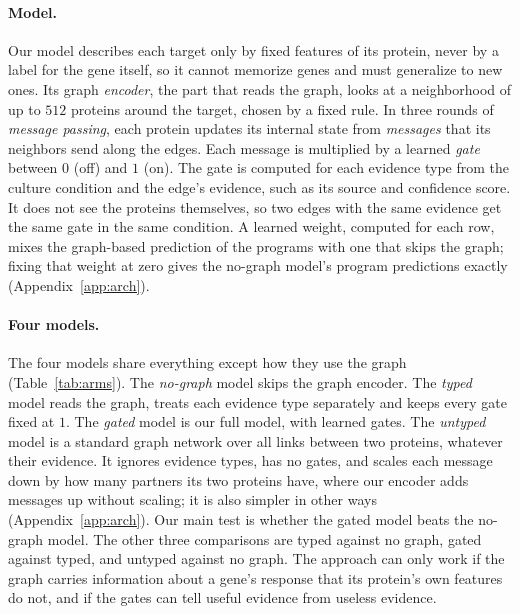 \documentclass{article}
\begin{document}
\paragraph{Model.} Our model describes each target only by fixed features of its protein, never by a label
for the gene itself, so it cannot memorize genes and must generalize to new ones. Its graph
\emph{encoder}, the part that reads the graph, looks at a neighborhood of up to $512$ proteins around the
target, chosen by a fixed rule. In three rounds of \emph{message passing}, each protein updates its
internal state from \emph{messages} that its neighbors send along the edges. Each message is multiplied by
a learned \emph{gate} between $0$ (off) and $1$ (on). The gate is computed for each evidence type from the
culture condition and the edge's evidence, such as its source and confidence score. It does not see the
proteins themselves, so two edges with the same evidence get the same gate in the same condition. A learned weight,
computed for each row, mixes the graph-based prediction of the programs with one that skips the graph;
fixing that weight at zero gives the no-graph model's program predictions exactly
(Appendix~\ref{app:arch}).

\paragraph{Four models.} The four models share everything except how they use the graph
(Table~\ref{tab:arms}). The \emph{no-graph} model skips the graph encoder. The \emph{typed} model reads
the graph, treats each evidence type separately and keeps every gate fixed at $1$. The \emph{gated} model
is our full model, with learned gates. The \emph{untyped} model is a standard graph network
\citep{kipf2017gcn} over all links between two proteins, whatever their evidence. It ignores evidence
types, has no gates, and scales
each message down by how many partners its two proteins have, where our encoder adds messages up without
scaling; it is also simpler in other ways (Appendix~\ref{app:arch}). Our main test is whether the gated
model beats the no-graph model. The other three comparisons are typed against no graph, gated against
typed, and untyped against no graph. The approach can only work if the graph carries information about a
gene's response that its protein's own features do not, and if the gates can tell useful evidence from
useless evidence.
\end{document}
